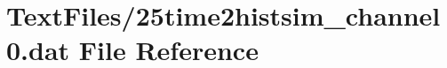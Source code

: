\hypertarget{25time2histsim__channel0_8dat}{}\section{Text\+Files/25time2histsim\+\_\+channel0.dat File Reference}
\label{25time2histsim__channel0_8dat}
